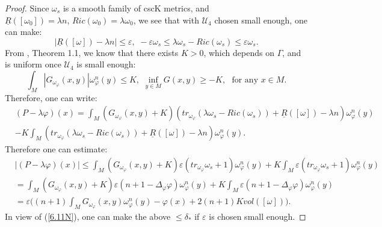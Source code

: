 \documentclass[11pt]{amsart}
\numberwithin{equation}{section}
\newcommand \eps{\varepsilon}
\begin{document}
\begin{proof}
Since $\omega_s$ is a smooth family of cscK metrics,  and $\underline{R}([\omega_0])=\lambda n,\,Ric(\omega_0)=\lambda\omega_0$,  we see that with $\mathcal{U}_4$ chosen small enough,  one can make:
\begin{equation*}
|\underline{R}([\omega])-\lambda n|\le \eps,\,\,-\eps\omega_s\le \lambda\omega_s-Ric(\omega_s)\le \eps\omega_s.
\end{equation*}
From \cite{GPSS2024},  Theorem 1.1,  we know that  there exists $K>0$,  which depends on $\Gamma$,  and is uniform once $\mathcal{U}_4$ is small enough:
\begin{equation}\label{6.11N}
\int_M|G_{\omega_{\varphi}}(x,y)|\omega_{\varphi}^n(y)\le K,\,\,\inf_{y\in M}G(x,y)\ge -K,\,\,\text{ for any $x\in M$}.
\end{equation}
Therefore,  one can write:
\begin{equation*}
\begin{split}
&(P-\lambda\varphi)(x)=\int_M(G_{\omega_{\varphi}}(x,y)+K)(tr_{\omega_{\varphi}}(\lambda \omega_s-Ric(\omega_s))+\underline{R}([\omega])-\lambda n)\omega_{\varphi}^n(y)\\
&-K\int_M(tr_{\omega_{\varphi}}(\lambda \omega_s-Ric(\omega_s))+\underline{R}([\omega])-\lambda n)\omega_{\varphi}^n(y).
\end{split}
\end{equation*}
Therefore one can estimate:
\begin{equation*}
\begin{split}
&|(P-\lambda \varphi)(x)|\le \int_M(G_{\omega_{\varphi}}(x,y)+K)\eps(tr_{\omega_{\varphi}}\omega_s+1)\omega_{\varphi}^n(y)+K\int_M\eps(tr_{\omega_{\varphi}}\omega_s+1)\omega_{\varphi}^n(y)\\
&=\int_M(G_{\omega_{\varphi}}(x,y)+K)\eps(n+1-\Delta_{\varphi}\varphi)\omega_{\varphi}^n(y)+K\int_M\eps(n+1-\Delta_{\varphi}\varphi)\omega_{\varphi}^n(y)\\
&=\eps\bigg((n+1)\int_MG_{\omega_{\varphi}}(x,y)\omega_{\varphi}^n(y)-\varphi(x)+2(n+1)Kvol([\omega])\bigg).
\end{split}
\end{equation*}
In view of (\ref{6.11N}),  one can make the above $\le \delta_*$ if $\eps$ is chosen small enough.
\end{proof}
\end{document}
